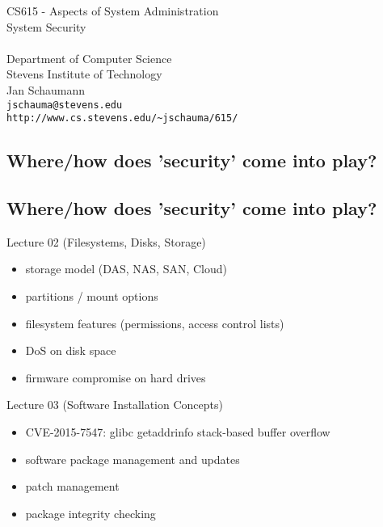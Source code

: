 \documentclass[xga]{xdvislides}
\begin{document}
\setfontphv

\lhead{\slidetitle}                               %
\cfoot{\relax}                               %
\rfoot{\Gray{\today}}
\vspace*{\fill}
\begin{center}
	\Hugesize
		CS615 - Aspects of System Administration\\ [1em]
		System Security\\ [1em]
	\hspace*{5mm}\blueline\\ [1em]
	\Normalsize
		Department of Computer Science\\
		Stevens Institute of Technology\\
		Jan Schaumann\\
		\verb+jschauma@stevens.edu+ \\
		\verb+http://www.cs.stevens.edu/~jschauma/615/+
\end{center}
\vspace*{\fill}

\subsection{Where/how does 'security' come into play?}

\subsection{Where/how does 'security' come into play?}
Lecture 02 (Filesystems, Disks, Storage)
\begin{itemize}
	\item storage model (DAS, NAS, SAN, Cloud)
	\item partitions / mount options
	\item filesystem features (permissions, access control lists)
	\item DoS on disk space
	\item firmware compromise on hard drives
\end{itemize}
\vspace{.5in}
Lecture 03 (Software Installation Concepts)
\begin{itemize}
	\item CVE-2015-7547: glibc getaddrinfo stack-based buffer overflow
	\item software package management and updates
	\item patch management
	\item package integrity checking
\end{itemize}
\end{document}
